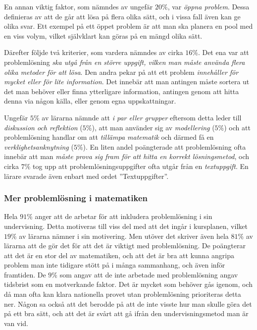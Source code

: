 \textcolor{lila}{En annan viktig faktor, som nämndes av ungefär $20\%$, var \textsl{öppna problem}. Dessa definieras av att de går att lösa på flera olika sätt, och i vissa fall även kan ge olika svar. Ett exempel på ett öppet problem är att man ska planera en pool med en viss volym, vilket självklart kan göras på en mängd olika sätt.}

\textcolor{lila}{Därefter följde två kriterier, som vardera nämndes av cirka $16\%$. Det ena var att problemlösning \textsl{ska utgå från en större uppgift, vilken man måste använda flera olika metoder för att lösa}. Den andra pekar på att ett problem \textsl{innehåller för mycket eller för lite information}. Det innebär att man antingen måste sortera ut det man behöver eller finna ytterligare information, antingen genom att hitta denna via någon källa, eller genom egna uppskattningar.}

\textcolor{lila}{Ungefär $5\%$ av lärarna nämnde att \textsl{i par eller grupper} eftersom detta leder till \textsl{diskussion och reflektion} ($5\%$), att man använder sig av \textsl{modellering} ($5\%$) och att problemlösning handlar om att \textsl{tillämpa matematik} och därmed få en \textsl{verklighetsanknytning} ($5\%$). En liten andel poängterade att problemlösning ofta innebär att man \textsl{måste prova sig fram för att hitta en korrekt lösningsmetod}, och cirka $7\%$ tog upp att problemlösningsuppgifter ofta utgår från en \textsl{textuppgift}. En lärare svarade även enbart med ordet ''Textuppgifter''.}

\subsubsection{Mer problemlösning i matematiken}
\label{sec:MerProblemlosning}

\textcolor{lila}{Hela $91\%$ anger att de arbetar för att inkludera problemlösning i sin undervisning. Detta motiveras till viss del med att det ingår i kursplanen, vilket $19\%$ av lärarna nämner i sin motivering. Men utöver det skriver även hela $81\%$ av lärarna att de gör det för att det är viktigt med problemlösning. De poängterar att det är en stor del av matematiken, och att det är bra att kunna angripa problem man inte tidigare stött på i många sammanhang, och även inför framtiden. De $9\%$ som angav att de inte arbetade med problemlösning angav tidsbrist som en motverkande faktor. Det är mycket som behöver gås igenom, och då man ofta kan klara nationella provet utan problemlösning prioriteras detta ner. Någon sa också att det berodde på att de inte visste hur man skulle göra det på ett bra sätt, och att det är svårt att gå ifrån den undervisningsmetod man är van vid.}

